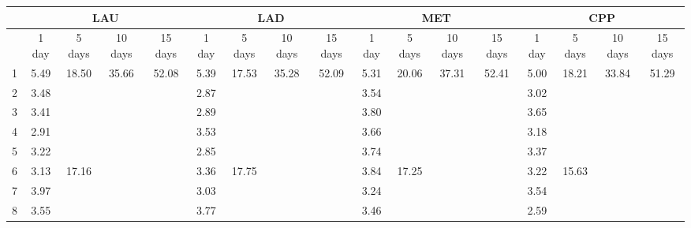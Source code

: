 \begin{center}
\begin{tabular}{| l || c | c | c | c | c | c | c | c | c | c | c | c | c | c | c | c |}\hline
 & \multicolumn{4}{c|}{LAU} & \multicolumn{4}{c|}{LAD} & \multicolumn{4}{c|}{MET} & \multicolumn{4}{c|}{CPP} \\\hline
 & 1 day & 5 days & 10 days & 15 days & 1 day & 5 days & 10 days & 15 days & 1 day & 5 days & 10 days & 15 days & 1 day & 5 days & 10 days & 15 days \\\hline
1 & \multirow{1}{*}{ 5.49 }  & \multirow{5}{*}{ 18.50 }  & \multirow{10}{*}{ 35.66 }  & \multirow{15}{*}{ 52.08 }  & \multirow{1}{*}{ 5.39 }  & \multirow{5}{*}{ 17.53 }  & \multirow{10}{*}{ 35.28 }  & \multirow{15}{*}{ 52.09 }  & \multirow{1}{*}{ 5.31 }  & \multirow{5}{*}{ 20.06 }  & \multirow{10}{*}{ 37.31 }  & \multirow{15}{*}{ 52.41 }  & \multirow{1}{*}{ 5.00 }  & \multirow{5}{*}{ 18.21 }  & \multirow{10}{*}{ 33.84 }  & \multirow{15}{*}{ 51.29 }  \\\cline{2-2}\cline{6-6}\cline{10-10}\cline{14-14}
2 & \multirow{1}{*}{ 3.48 }  & & & & \multirow{1}{*}{ 2.87 }  & & & & \multirow{1}{*}{ 3.54 }  & & & & \multirow{1}{*}{ 3.02 }  & & & \\\cline{2-2}\cline{6-6}\cline{10-10}\cline{14-14}
3 & \multirow{1}{*}{ 3.41 }  & & & & \multirow{1}{*}{ 2.89 }  & & & & \multirow{1}{*}{ 3.80 }  & & & & \multirow{1}{*}{ 3.65 }  & & & \\\cline{2-2}\cline{6-6}\cline{10-10}\cline{14-14}
4 & \multirow{1}{*}{ 2.91 }  & & & & \multirow{1}{*}{ 3.53 }  & & & & \multirow{1}{*}{ 3.66 }  & & & & \multirow{1}{*}{ 3.18 }  & & & \\\cline{2-2}\cline{6-6}\cline{10-10}\cline{14-14}
5 & \multirow{1}{*}{ 3.22 }  & & & & \multirow{1}{*}{ 2.85 }  & & & & \multirow{1}{*}{ 3.74 }  & & & & \multirow{1}{*}{ 3.37 }  & & & \\\cline{2-2}\cline{6-6}\cline{10-10}\cline{14-14}\cline{3-3}\cline{7-7}\cline{11-11}\cline{15-15}
6 & \multirow{1}{*}{ 3.13 }  & \multirow{5}{*}{ 17.16 }  & & & \multirow{1}{*}{ 3.36 }  & \multirow{5}{*}{ 17.75 }  & & & \multirow{1}{*}{ 3.84 }  & \multirow{5}{*}{ 17.25 }  & & & \multirow{1}{*}{ 3.22 }  & \multirow{5}{*}{ 15.63 }  & & \\\cline{2-2}\cline{6-6}\cline{10-10}\cline{14-14}
7 & \multirow{1}{*}{ 3.97 }  & & & & \multirow{1}{*}{ 3.03 }  & & & & \multirow{1}{*}{ 3.24 }  & & & & \multirow{1}{*}{ 3.54 }  & & & \\\cline{2-2}\cline{6-6}\cline{10-10}\cline{14-14}
8 & \multirow{1}{*}{ 3.55 }  & & & & \multirow{1}{*}{ 3.77 }  & & & & \multirow{1}{*}{ 3.46 }  & & & & \multirow{1}{*}{ 2.59 }  & & & \\\cline{2-2}\cline{6-6}\cline{10-10}\cline{14-14}

\end{tabular}
\end{center}

